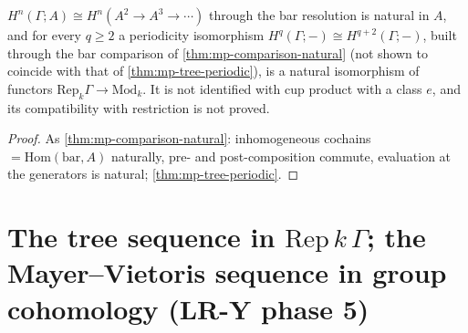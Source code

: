 \begin{theorem}\label{thm:mp-periodic-natural}
  \leanok
  $H^n(\Gamma;A)\cong H^n(A^2\to A^3\to\cdots)$ through the bar resolution is natural in $A$, and for every $q\ge2$ a periodicity
  isomorphism $H^q(\Gamma;-)\cong H^{q+2}(\Gamma;-)$, built through the bar comparison of \ref{thm:mp-comparison-natural} (not
  shown to coincide with that of \ref{thm:mp-tree-periodic}), is a natural isomorphism of functors
  $\mathrm{Rep}_k\Gamma\to\mathrm{Mod}_k$.  It is not identified with cup product with a class $e$, and its compatibility with
  restriction is not proved.
\end{theorem}
\begin{proof}
  \leanok
  As \ref{thm:mp-comparison-natural}: inhomogeneous cochains $=\mathrm{Hom}(\mathrm{bar},A)$ naturally, pre- and post-composition
  commute, evaluation at the generators is natural; \ref{thm:mp-tree-periodic}.
\end{proof}

\section{The tree sequence in \texorpdfstring{$\mathrm{Rep}\,k\,\Gamma$}{Rep k Gamma}; the Mayer--Vietoris sequence in group cohomology (LR-Y phase 5)}

